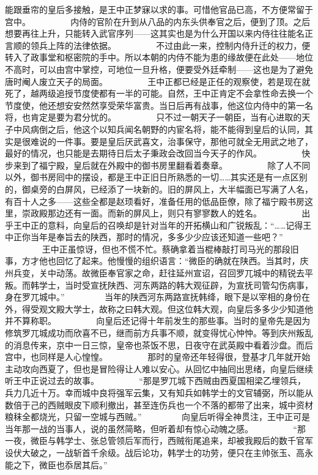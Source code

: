 能跟垂帘的皇后多接触，是王中正梦寐以求的事。可惜他官品已高，不方便常留于宫中。
　　
　　内侍的官阶在升到从八品的内东头供奉官之后，便到了顶。之后想要再往上升，只能转入武官序列——这其实也是为什么开国以来内侍往往能名正言顺的领兵上阵的法律依据。
　　
　　不过由此一来，控制内侍升迁的权力，便转入了政事堂和枢密院的手中。所以本朝的内侍不能为患的缘故便在此处——地位不高时，可以由宫中掌控，可地位一旦升格，便要受外廷牵制——这也是为了避免唐时阉人废立天子的局面。
　　
　　王中正都已经是正任的观察使，若是现在就死了，越两级追授节度使都有一半的可能。自然，王中正肯定不会拿性命去换一个节度使，他还想安安然然享受荣华富贵。当日后再有战事，他这位内侍中的第一名将，也肯定是要为君分忧的。
　　
　　只不过一朝天子一朝臣，当有心进取的天子中风病倒之后，他这个以知兵闻名朝野的内宦名将，能不能得到皇后的认同，其实是很难说的一件事。要是皇后厌武喜文，治事保守，那他可就全无用武之地了，最好的情况，也只能是去期待日后太子秉政会改回当今天子的作风。
　　
　　快步来到了福宁殿，皇后就在外殿中的御书房里翻看着奏章。
　　
　　除了人不同以外，御书房囘中的摆设，都是王中正旧日所熟悉的一切……其实还是有一点区别的，御桌旁的白屏风，已经添了一块新的。旧的屏风上，大半幅面已写满了人名，有百十人之多——这些全都是赵顼看好，准备任用的低品臣僚，除了福宁殿书房这里，崇政殿那边还有一面。而新的屏风上，则只有寥寥数人的姓名。
　　
　　出乎王中正的意料，向皇后的召唤却是针对当年的开拓横山和广锐叛乱：“……记得王中正你当年是奉旨去的陕西，那时的情况，多多少少应该还知道一些吧？”
　　
　　王中正虽惊讶，但也不慌不忙。蔡确拿着当棍棒敲打司马光的那段旧事，方才他也回忆了起来。他慢慢的组织语言：“微臣的确就在陕西。当其时，庆州兵变，关中动荡。故微臣奉官家之命，赶往延州宣诏，召回罗兀城中的精锐去平叛。而韩学士，当时受宣抚陕西、河东两路的韩大观征辟，为宣抚司管勾伤病事，身在罗兀城中。”
　　
　　当年的陕西河东两路宣抚韩绛，眼下是以宰相的身份在外，得受观文殿大学士，故称之曰韩大观。但这位韩大观，向皇后多多少少知道他并不算称职。
　　
　　向皇后还记得十年前发生的那些事。当时的皇帝先是因为修筑罗兀城成功而欣喜不已，继而前方兵事不顺，就变得忧心忡忡。等到庆州叛乱的消息传来，京中一日三惊，皇帝也茶饭不思，日夜守在武英殿中看着沙盘。而后宫中，也同样是人心惶惶。
　　
　　那时的皇帝还年轻得很，登基才几年就开始主动攻向西夏了，但也是冒险得让人难以安心。从回忆中抽囘出思绪，向皇后继续听王中正说过去的故事。
　　
　　“那是罗兀城下西贼由西夏国相梁乙埋领兵，兵力几近十万。幸而城中良将强军云集，又有知兵如韩学士的文官辅弼，所以能从数倍于己的西贼眼皮下顺利撤出，甚至连伤兵也一个不落的都带了出来，城中资材粮秣全都烧光，只留一空城与西贼。”
　　
　　向皇后听得全神贯注，王中正可是当年那一战的当事人，说的虽然简略，但听着却有惊心动魄之感。
　　
　　“那一夜，微臣与韩学士、张总管领后军而行，西贼衔尾追来，却被我殿后的数千官军设伏大破之，一战斩首千余级。战后论功，韩学士的功劳，便只在主帅张玉、高永能之下，微臣也忝居其后。”
